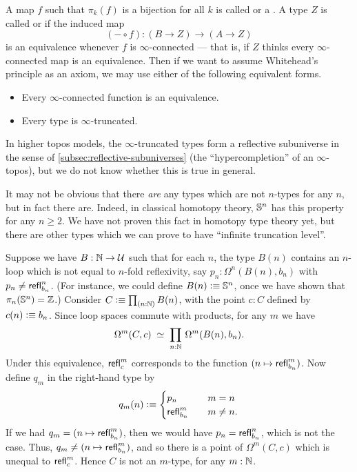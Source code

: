 A map $f$ such that $\pi_k(f)$ is a bijection for all $k$ is called  or a .
A type $Z$ is called  or  if the induced map
\[(-\circ f):(B\to Z) \to (A\to Z)\]
is an equivalence whenever $f$ is $\infty$-connected --- that is, if $Z$ thinks every $\infty$-connected map is an equivalence.
Then if we want to assume Whitehead's principle as an axiom, we may use either of the following equivalent forms.
\begin{itemize}
\item Every $\infty$-connected function is an equivalence.
\item Every type is $\infty$-truncated.
\end{itemize}
In higher topos models, the $\infty$-truncated types form a reflective subuniverse in the sense of \autoref{subsec:reflective-subuniverses} (the ``hypercompletion'' of an $\infty$-topos), but we do not know whether this is true in general.

It may not be obvious that there \emph{are} any types which are not $n$-types for any $n$, but in fact there are.
Indeed, in classical homotopy theory, $\mathbb{S}^n$ has this property for any $n\ge 2$.
We have not proven this fact in homotopy type theory yet, but there are other types which we can prove to have ``infinite truncation level''.

\begin{eg}
  Suppose we have $B:\mathbb{N}\to\mathcal{U}$ such that for each $n$, the type $B(n)$ contains an $n$-loop which is not equal to $n$-fold reflexivity, say $p_n:\Omega^n(B(n),b_n)$ with $p_n \neq \mathsf{refl}_{b_n}^n$.
  (For instance, we could define $B(n)\vcentcolon\equiv \mathbb{S}^n$, once we have shown that $\pi_n(\mathbb{S}^n)=\mathbb{Z}$.)
  Consider $C\defeq \prd{n:\nat} B(n)$, with the point $c:C$ defined by $c(n)\vcentcolon\equiv b_n$.
  Since loop spaces commute with products, for any $m$ we have
  \[\eqvspaced{\Omega^m (C,c)}{\prd{n:\nat}\Omega^m(B(n),b_n)}.\]
  Under this equivalence, $\mathsf{refl}_{c}^m$ corresponds to the function $(n\mapsto \mathsf{refl}_{b_n}^m)$.
  Now define $q_m$ in the right-hand type by
  \[ q_m(n) \vcentcolon\equiv
  \begin{cases}
    p_n &\quad m=n\\
    \mathsf{refl}_{b_n}^m &\quad m\neq n.
  \end{cases}
  \]
  If we had $q_m = (n\mapsto \mathsf{refl}_{b_n}^m)$, then we would have $p_n = \mathsf{refl}_{b_n}^n$, which is not the case.
  Thus, $q_m \neq (n\mapsto \mathsf{refl}_{b_n}^m)$, and so there is a point of $\Omega^m(C,c)$ which is unequal to $\mathsf{refl}_{c}^m$.
  Hence $C$ is not an $m$-type, for any $m:\mathbb{N}$.
\end{eg}

